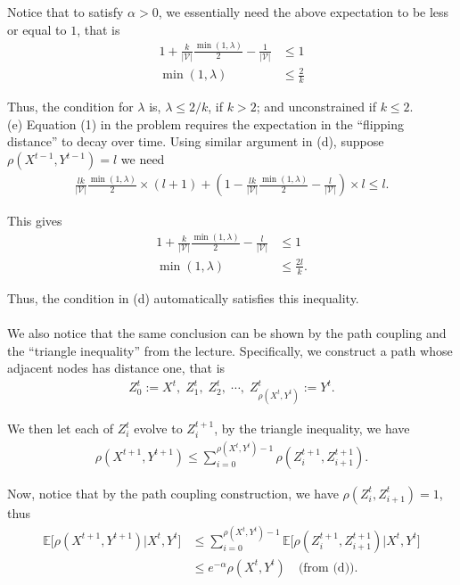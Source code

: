 \documentclass{article}
\newcommand{\qeds}{\hfill\qedsymbol}
\begin{document}
Notice that to satisfy $\alpha > 0$, we essentially need the above expectation to be less or equal to $1$, that is
\begin{align*}
	1 + \frac{k}{|\mathscr{V}|}\frac{\min(1, \lambda)}{2} - \frac{1}{|\mathscr{V}|} &\leq 1 \\
	\min(1, \lambda) &\leq \frac{2}{k}
\end{align*}

Thus, the condition for $\lambda$ is, $\lambda \leq 2/k$, if $k > 2$; and unconstrained if $ k \leq 2$.
\\

\noindent
(e) Equation (1) in the problem requires the expectation in the ``flipping distance'' to decay 
over time. Using similar argument in (d), suppose $\rho(X^{t-1}, Y^{t-1}) = l$ we need
\begin{align*}
	\frac{lk}{|\mathscr{V}|}\frac{\min(1, \lambda)}{2}\times(l+1) +(1 - \frac{lk}{|\mathscr{V}|}\frac{\min(1, \lambda)}{2} - \frac{l}{|\mathscr{V}|})\times l \leq l.
\end{align*}

This gives
\begin{align*}
	1 + \frac{k}{|\mathscr{V}|}\frac{\min(1, \lambda)}{2} - \frac{l}{|\mathscr{V}|} &\leq 1 \\
	\min(1, \lambda) &\leq \frac{2l}{k}.
\end{align*}

Thus, the condition in (d) automatically satisfies this inequality. \qeds
\\
\\

We also notice that the same conclusion can be shown by the path coupling
and the ``triangle inequality'' from the lecture. Specifically, we construct
a path whose adjacent nodes has distance one, that is
\begin{align*}
	Z^t_0 := X^t, \; Z^t_1, \; Z^t_2, \; \cdots, \; Z^t_{\rho(X^t, Y^t)} := Y^t.
\end{align*}

We then let each of $Z^t_i$ evolve to $Z^{t+1}_i$, by the triangle inequality,
we have
\begin{align*}
	\rho(X^{t+1}, Y^{t+1}) \leq \sum_{i=0}^{\rho(X^t, Y^t) - 1}\rho(Z^{t+1}_i, Z^{t+1}_{i+1}).
\end{align*}

Now, notice that by the path coupling construction, we have $\rho(Z^t_i, Z^t_{i+1}) = 1$, thus
\begin{align*}
	\mathbb{E}\big[\rho(X^{t+1}, Y^{t+1}) \big| X^t, Y^t\big]
	&\leq
	\sum_{i=0}^{\rho(X^t, Y^t) - 1} \mathbb{E}\big[\rho(Z^{t+1}_i, Z^{t+1}_{i+1}) \big| X^t, Y^t\big]\\
	&\leq e^{-\alpha} \rho(X^t, Y^t) \quad \text{(from (d))}.
\end{align*}\qeds
\pagebreak
\end{document}
